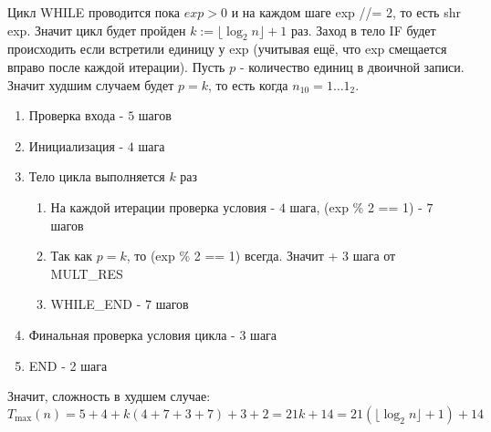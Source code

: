 \documentclass[12pt]{article}
\begin{document}
Цикл WHILE проводится пока $exp>0$ и на каждом шаге exp //= 2, то есть shr exp. Значит цикл будет пройден $k:=\lfloor\log_2 n\rfloor+1$ раз. Заход в тело IF будет происходить если встретили единицу у exp (учитывая ещё, что exp смещается вправо после каждой итерации). Пусть $p$ - количество единиц в двоичной записи. Значит худшим случаем будет $p=k$, то есть когда $n_{10}=1\dots1_2$.

\begin{enumerate}
    \item Проверка входа - $5$ шагов
    \item Инициализация - $4$ шага
    \item Тело цикла выполняется $k$ раз
    \begin{enumerate}
        \item На каждой итерации проверка условия - $4$ шага, (exp \% 2 == 1) - $7$ шагов
        \item Так как $p=k$, то (exp \% 2 == 1) всегда. Значит + 3 шага от MULT\_RES
        \item WHILE\_END - $7$ шагов
    \end{enumerate}
    \item Финальная проверка условия цикла - 3 шага
    \item END - 2 шага
\end{enumerate}

Значит, сложность в худшем случае:
\[
    T_{\max}(n) = 5+4+k(4 + 7 + 3 + 7) + 3 + 2 = 21k + 14 = 21(\lfloor\log_2 n\rfloor+1) + 14
\]
\end{document}
